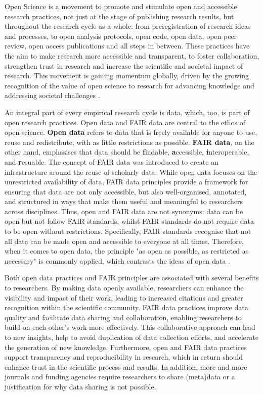 

\label{introduction}

Open Science is a movement to promote and stimulate open and accessible research practices, not just at the stage of publishing research results, but throughout the research cycle as a whole: from preregistration of research ideas and processes, to open analysis protocols, open code, open data, open peer review, open access publications and all steps in between. These practices have the aim to make research more accessible and transparent, to foster collaboration, strengthen trust in research and increase the scientific and societal impact of research. This movement is gaining momentum globally, driven by the growing recognition of the value of open science to research for advancing knowledge and addressing societal challenges \cite{UNESCO}.

An integral part of every empirical research cycle is data, which, too, is part of open research practices. Open data and FAIR data are central to the ethos of open science. \textbf{Open data} refers to data that is freely available for anyone to use, reuse and redistribute, with as little restrictions as possible. \textbf{FAIR data}, on the other hand, emphasises that data should be \textbf{f}indable, \textbf{a}ccessible, \textbf{i}nteroperable, and \textbf{r}esuable. The concept of FAIR data was introduced to create an infrastructure around the reuse of scholarly data. While open data focuses on the unrestricted availability of data, FAIR data principles provide a framework for ensuring that data are not only accessible, but also well-organised, annotated, and structured in ways that make them useful and meaningful to researchers across disciplines. Thus, open and FAIR data are not synonyms: data can be open but not follow FAIR standards, whilst FAIR standards do not require data to be open without restrictions. Specifically, FAIR standards recognise that not all data can be made open and accessible to everyone at all times. Therefore, when it comes to open data, the principle "as open as possible, as restricted as necessary" is commonly applied, which contrasts the ideas of open data \cite{wilkinson2016fair}. 

Both open data practices and FAIR principles are associated with several benefits to researchers. By making data openly available, researchers can enhance the visibility and impact of their work, leading to increased citations and greater recognition within the scientific community. FAIR data practices improve data quality and facilitate data sharing and collaboration, enabling researchers to build on each other's work more effectively. This collaborative approach can lead to new insights, help to avoid duplication of data collection efforts, and accelerate the generation of new knowledge. Furthermore, open and FAIR data practices support transparency and reproducibility in research, which in return should enhance trust in the scientific process and results. In addition, more and more journals and funding agencies require researchers to share (meta)data or a justification for why data sharing is not possible. 

